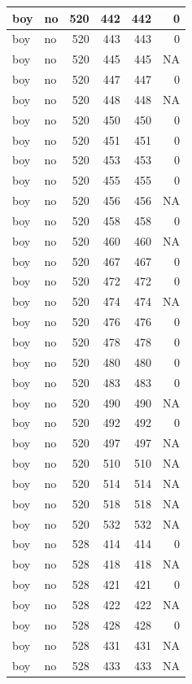 \documentclass[man]{apa6}
\begin{document}
\begin{tabular}{l|l|r|r|r|r}
\hline
boy & no & 520 & 442 & 442 & 0\\
\hline
boy & no & 520 & 443 & 443 & 0\\
\hline
boy & no & 520 & 445 & 445 & NA\\
\hline
boy & no & 520 & 447 & 447 & 0\\
\hline
boy & no & 520 & 448 & 448 & NA\\
\hline
boy & no & 520 & 450 & 450 & 0\\
\hline
boy & no & 520 & 451 & 451 & 0\\
\hline
boy & no & 520 & 453 & 453 & 0\\
\hline
boy & no & 520 & 455 & 455 & 0\\
\hline
boy & no & 520 & 456 & 456 & NA\\
\hline
boy & no & 520 & 458 & 458 & 0\\
\hline
boy & no & 520 & 460 & 460 & NA\\
\hline
boy & no & 520 & 467 & 467 & 0\\
\hline
boy & no & 520 & 472 & 472 & 0\\
\hline
boy & no & 520 & 474 & 474 & NA\\
\hline
boy & no & 520 & 476 & 476 & 0\\
\hline
boy & no & 520 & 478 & 478 & 0\\
\hline
boy & no & 520 & 480 & 480 & 0\\
\hline
boy & no & 520 & 483 & 483 & 0\\
\hline
boy & no & 520 & 490 & 490 & NA\\
\hline
boy & no & 520 & 492 & 492 & 0\\
\hline
boy & no & 520 & 497 & 497 & NA\\
\hline
boy & no & 520 & 510 & 510 & NA\\
\hline
boy & no & 520 & 514 & 514 & NA\\
\hline
boy & no & 520 & 518 & 518 & NA\\
\hline
boy & no & 520 & 532 & 532 & NA\\
\hline
boy & no & 528 & 414 & 414 & 0\\
\hline
boy & no & 528 & 418 & 418 & NA\\
\hline
boy & no & 528 & 421 & 421 & 0\\
\hline
boy & no & 528 & 422 & 422 & NA\\
\hline
boy & no & 528 & 428 & 428 & 0\\
\hline
boy & no & 528 & 431 & 431 & NA\\
\hline
boy & no & 528 & 433 & 433 & NA\\

\end{tabular}
\end{document}
